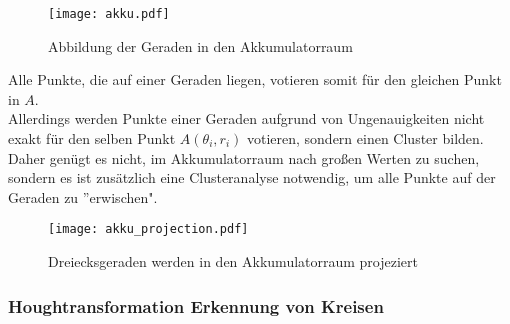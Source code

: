 \begin{figure}[H]
  \begin{center}
    \texttt{[image: akku.pdf]}
    \caption{Abbildung der Geraden in den Akkumulatorraum}
    \label{fig:akku}
  \end{center}
\end{figure}

Alle Punkte, die auf einer Geraden liegen, votieren somit für den gleichen Punkt in $A$. \\ 
Allerdings werden Punkte einer Geraden aufgrund von Ungenauigkeiten nicht exakt für den selben Punkt $A(\theta_i, r_i)$ votieren, sondern einen Cluster bilden. Daher genügt es nicht, im Akkumulatorraum nach großen Werten zu suchen, sondern es ist zusätzlich eine Clusteranalyse notwendig, um alle Punkte auf der Geraden zu ''erwischen".
\begin{figure}[H]
  \begin{center}
    \texttt{[image: akku\_projection.pdf]}
    \caption{Dreiecksgeraden werden in den Akkumulatorraum projeziert}
    \label{fig:akku_projection}
  \end{center}
\end{figure}
 

			
		\subsubsection{Houghtransformation Erkennung von Kreisen}

	





